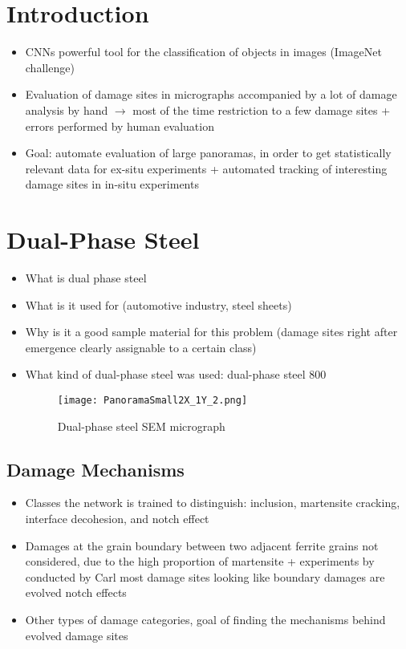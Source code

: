\documentclass[10pt,a4paper]{report}
\begin{document}
\chapter{Introduction}
\begin{itemize}
\item CNNs powerful tool for the classification of objects in images (ImageNet challenge)
\item Evaluation of damage sites in micrographs accompanied by a lot of damage analysis by hand $\rightarrow$ most of the time restriction to a few damage sites + errors performed by human evaluation
\item Goal: automate evaluation of large panoramas, in order to get statistically relevant data for ex-situ experiments + automated tracking of interesting damage sites in in-situ experiments
\end{itemize}

\chapter{Dual-Phase Steel}
\begin{itemize}
\item What is dual phase steel
\item What is it used for (automotive industry, steel sheets)
\item Why is it a good sample material for this problem (damage sites right after emergence clearly assignable to a certain class)
\item What kind of dual-phase steel was used: dual-phase steel 800
\begin{figure}
\centering
  \texttt{[image: PanoramaSmall2X\_1Y\_2.png]}
  \caption{Dual-phase steel SEM micrograph}
  \label{fig:ANN}
\end{figure}

\end{itemize}
\section{Damage Mechanisms}
\begin{itemize}
\item Classes the network is trained to distinguish: inclusion, martensite cracking, interface decohesion, and notch effect
\item Damages at the grain boundary between two adjacent ferrite grains not considered, due to the high proportion of martensite + experiments by conducted by Carl most damage sites looking like boundary damages are evolved notch effects
\item Other types of damage categories, goal of finding the mechanisms behind evolved damage sites
\end{itemize}
\end{document}
